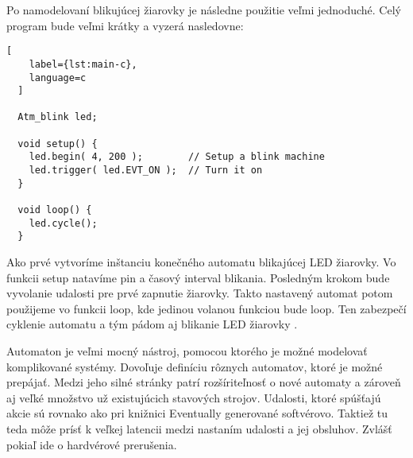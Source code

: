\par Po namodelovaní blikujúcej žiarovky je následne použitie veľmi jednoduché. Celý program bude veľmi krátky a vyzerá nasledovne:
\begin{lstlisting}[
    label={lst:main-c},
    language=c
  ]

  Atm_blink led;

  void setup() {
    led.begin( 4, 200 );        // Setup a blink machine
    led.trigger( led.EVT_ON );  // Turn it on
  }
  
  void loop() {
    led.cycle();
  }
\end{lstlisting}
Ako prvé vytvoríme inštanciu konečného automatu blikajúcej LED žiarovky. Vo funkcii setup natavíme pin a časový interval blikania. Posledným krokom bude vyvolanie udalosti pre prvé zapnutie žiarovky. Takto nastavený automat potom použijeme vo funkcii loop, kde jedinou volanou funkciou bude loop. Ten zabezpečí cyklenie automatu a tým pádom aj blikanie LED žiarovky \cite{tinkerspyAutomaton2021}.
\par Automaton je veľmi mocný nástroj, pomocou ktorého je možné modelovať komplikované systémy. Dovoľuje definíciu rôznych automatov, ktoré je možné prepájať. Medzi jeho silné stránky patrí rozšíriteľnosť o nové automaty a zároveň aj veľké množstvo už existujúcich stavových strojov. Udalosti, ktoré spúšťajú akcie sú rovnako ako pri knižnici Eventually generované softvérovo. Taktiež tu teda môže prísť k veľkej latencii medzi nastaním udalosti a jej obsluhov. Zvlášť pokiaľ ide o hardvérové prerušenia.